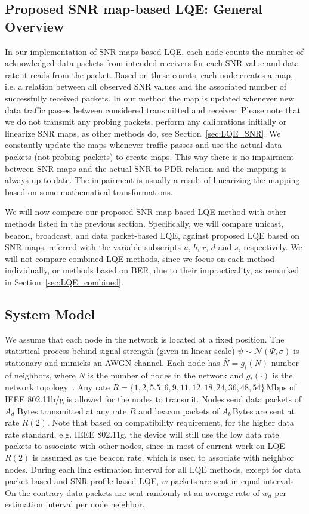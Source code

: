 \documentclass[11pt,draftclsnofoot,journal,onecolumn]{IEEEtran}
\begin{document}
\subsection{Proposed SNR map-based LQE: General Overview}
\label{sec:snr_maps_general_idea}

In our implementation of SNR maps-based LQE, each node counts the number of acknowledged data packets from intended receivers for each SNR value and data rate it reads from the packet. Based on these counts, each node creates a map, i.e. a relation between all observed SNR values and the associated number of successfully received packets. In our method the map is updated whenever new data traffic passes between considered transmitted and receiver. Please note that we do not transmit any probing packets, perform any calibrations initially or linearize SNR maps, as other methods do, see Section~\ref{sec:LQE_SNR}. We constantly update the maps whenever traffic passes and use the actual data packets (not probing packets) to create maps. This way there is no impairment between SNR maps and the actual SNR to PDR relation and the mapping is always up-to-date. The impairment is usually a result of linearizing the mapping based on some mathematical transformations.

We will now compare our proposed SNR map-based LQE method with other methods listed in the previous section. Specifically, we will compare unicast, beacon, broadcast, and data packet-based LQE, against proposed LQE based on SNR maps, referred with the variable subscripts $u$, $b$, $r$, $d$ and $s$, respectively. We will not compare combined LQE methods, since we focus on each method individually, or methods based on BER, due to their impracticality, as remarked in Section~\ref{sec:LQE_combined}.

\subsection{System Model}
\label{sec:system_model}

We assume that each node in the network is located at a fixed position. The statistical process behind signal strength (given in linear scale) $\psi\sim \mathcal{N}(\Psi,\sigma)$ is stationary and mimicks an AWGN channel. Each node has $\bar{N}=g_t(N)$ number of neighbors, where $N$ is the number of nodes in the network and $g_t(\cdot)$ is the network topology~\cite[Ch. 3]{Hekmat_phd_thesis}. Any rate $R=\{1, 2, 5.5, 6, 9, 11, 12, 18, 24, 36, 48, 54\}$\,Mbps of IEEE 802.11b/g is allowed for the nodes to transmit. Nodes send data packets of $A_d$ Bytes transmitted at any rate $R$ and beacon packets of $A_b$\,Bytes are sent at rate $R(2)$. Note that based on compatibility requirement, for the higher data rate standard, e.g. IEEE 802.11g, the device will still use the low data rate packets to associate with other nodes, since in most of current work on LQE $R(2)$ is assumed as the beacon rate, which is used to associate with neighbor nodes. During each link estimation interval for all LQE methods, except for data packet-based and SNR profile-based LQE, $w$ packets are sent in equal intervals. On the contrary data packets are sent randomly at an average rate of $w_d$ per estimation interval per node neighbor.
\end{document}
